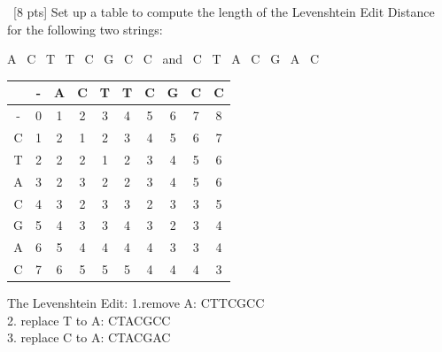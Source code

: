 \documentclass[12pt]{article}
\newenvironment{sol}[1][Solution]{\begin{trivlist}\item[\hskip\labelsep {\bfseries #1:}]}{\end{trivlist}}
\begin{document}
\begin{enumerate}
    \item \ [8 pts] Set up a table to compute the length of the Levenshtein Edit Distance for the following two strings:
        \begin{center}
        A  \ C \  T \ T \ C \ G \ C \ C \ and  \ C \ T \ A \ C \ G \ A \ C
    \end{center}
                \begin{sol}
        \hspace*{\fill}
        \begin{center}
            \begin{tabular}{|c|c|c|c|c|c|c|c|c|c|}
            \hline
                  &-  & A  & C & T & T & C & G & C & C  \\
                  \hline
                 - &0 & 1  & 2 & 3 & 4 & 5 & 6 & 7 & 8\\
                 \hline
                C & 1 & 2  & 1 & 2 & 3 & 4 & 5 & 6 & 7 \\
                \hline
                T &  2 & 2  & 2 & 1 & 2 & 3 & 4& 5&6\\
                \hline
                A &  3 & 2  & 3  & 2  & 2  &3 &4 &5 &6\\
                \hline
                C &  4 &  3& 2  & 3  & 3  &2 &3 &3 &5\\
                \hline
                G &  5 &  4 & 3  & 3  & 4  &3 &2 &3 &4\\
                \hline
                A &  6 &  5 & 4  & 4  & 4  &4 & 3& 3&4\\
                \hline
                C &  7 &  6 & 5  & 5  & 5  &4 & 4&4 &3\\
                \hline
            \end{tabular}
        \end{center}
        The Levenshtein Edit:
        1.remove A: CTTCGCC  \\
        2. replace T to A: CTACGCC \\ 
        3. replace C to A: CTACGAC
        \end{sol}


\end{enumerate}
\end{document}
